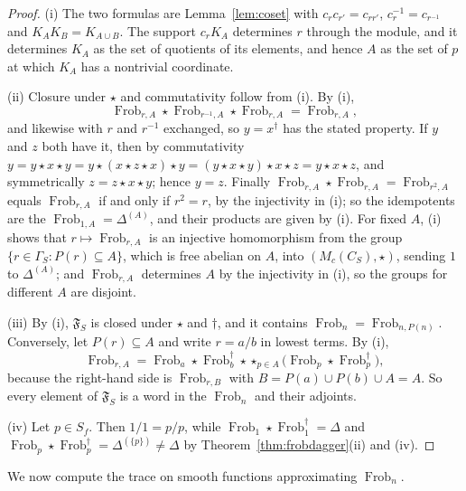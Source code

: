 \documentclass[11pt]{amsart}
\theoremstyle{definition}
\newcommand{\Frob}{\operatorname{Frob}}
\begin{document}
\begin{proof}
(i) The two formulas are Lemma~\ref{lem:coset} with $c_rc_{r'}=c_{rr'}$,
$c_r^{-1}=c_{r^{-1}}$ and $K_AK_B=K_{A\cup B}$. The support $c_rK_A$
determines $r$ through the module, and it determines $K_A$ as the set of
quotients of its elements, and hence $A$ as the set of $p$ at which $K_A$
has a nontrivial coordinate.

(ii) Closure under $\star$ and commutativity follow from (i). By (i),
\[
  \Frob_{r,A}\star\Frob_{r^{-1},A}\star\Frob_{r,A}=\Frob_{r,A},
\]
and likewise with $r$ and $r^{-1}$ exchanged, so $y=x^\dagger$ has the stated
property. If $y$ and $z$ both have it, then by commutativity
$y=y\star x\star y=y\star(x\star z\star x)\star y=(y\star x\star y)\star
x\star z=y\star x\star z$, and symmetrically $z=z\star x\star y$; hence
$y=z$. Finally $\Frob_{r,A}\star\Frob_{r,A}=\Frob_{r^2,A}$ equals
$\Frob_{r,A}$ if and only if $r^2=r$, by the injectivity in (i); so the
idempotents are the $\Frob_{1,A}=\Delta^{(A)}$, and their products are given
by (i). For fixed $A$, (i) shows that $r\mapsto\Frob_{r,A}$ is an injective
homomorphism from the group $\{r\in\Gamma_S:P(r)\subseteq A\}$, which is free
abelian on $A$, into $(M_c(C_S),\star)$, sending $1$ to $\Delta^{(A)}$; and
$\Frob_{r,A}$ determines $A$ by the injectivity in (i), so the groups for
different $A$ are disjoint.

(iii) By (i), $\mathfrak F_S$ is closed under $\star$ and $\dagger$, and it
contains $\Frob_n=\Frob_{n,P(n)}$. Conversely, let $P(r)\subseteq A$ and write
$r=a/b$ in lowest terms. By (i),
\[
  \Frob_{r,A}=\Frob_a\star\Frob_b^\dagger\star
   \mathop{\star}_{p\in A}\bigl(\Frob_p\star\Frob_p^\dagger\bigr),
\]
because the right-hand side is $\Frob_{r,B}$ with
$B=P(a)\cup P(b)\cup A=A$. So every element of $\mathfrak F_S$ is a word in
the $\Frob_n$ and their adjoints.

(iv) Let $p\in S_f$. Then $1/1=p/p$, while
$\Frob_1\star\Frob_1^\dagger=\Delta$ and
$\Frob_p\star\Frob_p^\dagger=\Delta^{(\{p\})}\ne\Delta$ by
Theorem~\ref{thm:frobdagger}(ii) and (iv).
\end{proof}

We now compute the trace on smooth functions approximating $\Frob_n$.
\end{document}
